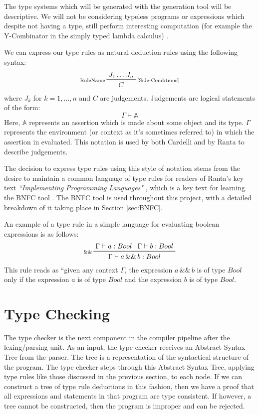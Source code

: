 \documentclass{UoYCSproject}
\begin{document}
The type systems which will be generated with the generation tool will be
descriptive. We will not be considering typeless programs or expressions which
despite not having a type, still perform interesting computation (for example
the Y-Combinator in the simply typed lambda calculus)\cite{NeilJones} \cite[p.~28]{SimonPeytonJones}
\cite[p.~155]{SimonPeytonJones}.

We can express our type rules as natural deduction rules using the following
syntax:
\begin{displaymath}
    \prftree[l,r]{\scriptsize [Side-Conditions]}{\scriptsize RuleName}{J_1 \dots J_n}{C}
\end{displaymath}
where $J_k$ for $k=1, \dots ,n$ and $C$ are judgements. Judgements are logical 
statements of the form:
\begin{displaymath}
    \Gamma \vdash \mathbb{A}
\end{displaymath}
Here, $\mathbb{A}$ represents an assertion which is made about some object and
its type. $\Gamma$ represents the environment (or context as it's sometimes
referred to) in which the assertion in evaluated. This notation is used by both
Cardelli \cite[p.~8]{CSHandbook} and by Ranta \cite{Ranta} to describe judgements.

The decision to express type rules using this style of notation stems from the 
desire to maintain a common language of type rules for readers of Ranta's key
text \textit{``Implementing Programming Languages"} \cite{Ranta}, which is a key 
text for learning the BNFC tool \cite{BNFC}. The BNFC tool is used throughout
this project, with a detailed breakdown of it taking place in Section 
\ref{sec:BNFC}. 

An example of a type rule in a simple language for evaluating boolean 
expressions is as follows:
\begin{displaymath}
    \prftree[l]{\scriptsize \&\&}{\Gamma \vdash a:Bool}{\Gamma \vdash b:Bool}{\Gamma \vdash a \, \&\& \, b: Bool}
\end{displaymath}
This rule reads as ``given any context $\Gamma$, the expression $a \, \&\& \, b$
is of type $Bool$ only if the expression $a$ is of type $Bool$ and the expression $b$
is of type $Bool$.

\section{Type Checking}
\label{sec:Chap1TypeChecking}
The type checker is the next component in the compiler pipeline after the
lexing/parsing unit. As an input, the type checker receives an Abstract Syntax
Tree from the parser. The tree is a representation of the syntactical structure
of the program. The type checker steps through this Abstract Syntax Tree, applying
type rules like those discussed in the previous section, to each node. If we
can construct a tree of type rule deductions in this fashion, then we have a
proof that all expressions and statements in that program are type consistent.
If however, a tree cannot be constructed, then the program is improper and
can be rejected.
\end{document}
